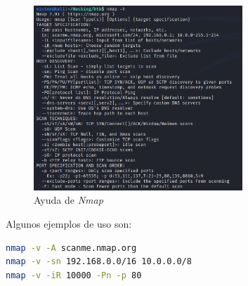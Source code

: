 \begin{figure}[h]
    \centering
    \includegraphics[width=0.7\textwidth]{images/sections/tools/nmap-help.png}
    \caption{Ayuda de \textit{Nmap}}
    \label{fig:nmap-help}
\end{figure}

Algunos ejemplos de uso son:

\begin{lstlisting}[language=bash]
nmap -v -A scanme.nmap.org
nmap -v -sn 192.168.0.0/16 10.0.0.0/8
nmap -v -iR 10000 -Pn -p 80
\end{lstlisting}